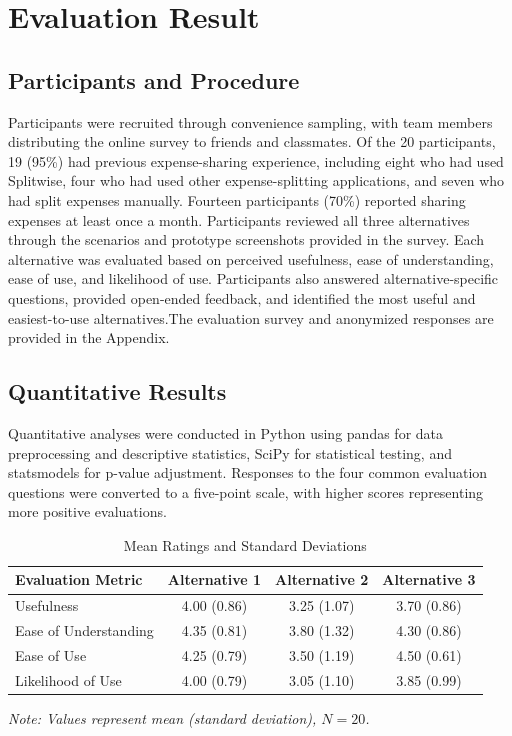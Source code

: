 \documentclass[letterpaper]{jdf}
\begin{document}
\section{Evaluation Result}
\subsection{Participants and Procedure}
Participants were recruited through convenience sampling, with team members distributing the online survey to friends and classmates. Of the 20 participants, 19 (95\%) had previous expense-sharing experience, including eight who had used Splitwise, four who had used other expense-splitting applications, and seven who had split expenses manually. Fourteen participants (70\%) reported sharing expenses at least once a month.
Participants reviewed all three alternatives through the scenarios and prototype screenshots provided in the survey. Each alternative was evaluated based on perceived usefulness, ease of understanding, ease of use, and likelihood of use. Participants also answered alternative-specific questions, provided open-ended feedback, and identified the most useful and easiest-to-use alternatives.The evaluation survey and anonymized responses are provided in the Appendix.



\subsection{Quantitative Results}
Quantitative analyses were conducted in Python using pandas for data preprocessing and descriptive statistics, SciPy for statistical testing, and statsmodels for p-value adjustment. Responses to the four common evaluation questions were converted to a five-point scale, with higher scores representing more positive evaluations.

\begin{table}[!htbp]
    \centering
    \small
    \setlength{\tabcolsep}{5pt}
    \caption{Mean Ratings and Standard Deviations}
    \label{tab:mean_ratings}
    \begin{tabular}{lccc}
        \toprule
        Evaluation Metric & Alternative 1 & Alternative 2 & Alternative 3 \\
        \midrule
        Usefulness           & 4.00 (0.86) & 3.25 (1.07) & 3.70 (0.86) \\
        Ease of Understanding & 4.35 (0.81) & 3.80 (1.32) & 4.30 (0.86) \\
        Ease of Use          & 4.25 (0.79) & 3.50 (1.19) & 4.50 (0.61) \\
        Likelihood of Use    & 4.00 (0.79) & 3.05 (1.10) & 3.85 (0.99) \\
        \bottomrule
    \end{tabular}

    \vspace{2pt}
    {\footnotesize \textit{Note: Values represent mean (standard deviation), $N=20$.}}
\end{table}
\end{document}
